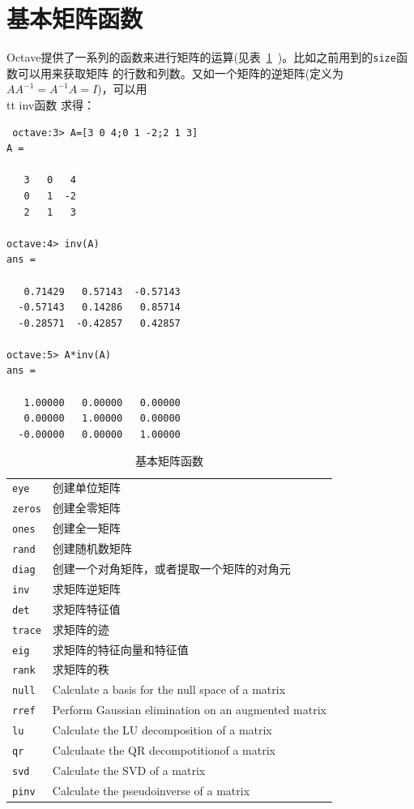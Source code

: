 \documentclass[UTF8,adobefonts]{ctexart}
\begin{document}
\section{基本矩阵函数}
Octave提供了一系列的函数来进行矩阵的运算(见表~\ref{tab:matfun}~)。比如之前用到的{\tt size}函数可以用来获取矩阵
的行数和列数。又如一个矩阵的逆矩阵(定义为 $AA^{-1}=A^{-1}A=I$)，可以用{\\tt inv}函数
求得：
\begin{verbatim}
 octave:3> A=[3 0 4;0 1 -2;2 1 3]
A =

   3   0   4
   0   1  -2
   2   1   3

octave:4> inv(A)
ans =

   0.71429   0.57143  -0.57143
  -0.57143   0.14286   0.85714
  -0.28571  -0.42857   0.42857

octave:5> A*inv(A)
ans =

   1.00000   0.00000   0.00000
   0.00000   1.00000   0.00000
  -0.00000   0.00000   1.00000

\end{verbatim}
\begin{table}
 \centering
 \caption{基本矩阵函数}
 \label{tab:matfun}
 \begin{tabular}{|ll|}
 \hline
 {\tt eye} & 创建单位矩阵 \\
 {\tt zeros} & 创建全零矩阵 \\
 {\tt ones} & 创建全一矩阵\\
 {\tt rand} & 创建随机数矩阵\\
 {\tt diag} & 创建一个对角矩阵，或者提取一个矩阵的对角元\\
 \hline
 {\tt inv} & 求矩阵逆矩阵\\
 {\tt det} & 求矩阵特征值\\
 {\tt trace} & 求矩阵的迹 \\
 \hline
 {\tt eig} & 求矩阵的特征向量和特征值 \\
 {\tt rank} &求矩阵的秩\\
 {\tt null} & Calculate a basis for the null space of a matrix\\
 {\tt rref} & Perform Gaussian elimination on an augmented matrix\\
 {\tt lu} & Calculate the LU decomposition of a matrix\\
 {\tt qr} & Calculaate the QR decompotitionof a matrix\\
 {\tt svd} & Calculate the SVD of a matrix \\
 {\tt pinv} & Calculate the pseudoinverse of a matrix\\
 \hline
 \end{tabular}

\end{table}
\end{document}
